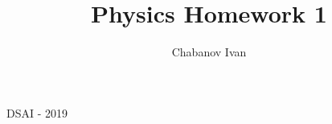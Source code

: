 

\begin{titlepage}
    \title{Physics Homework 1}
    \author{Chabanov Ivan}
    \maketitle
    DSAI - 2019


\end{titlepage}